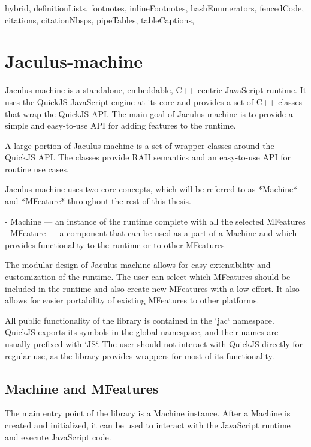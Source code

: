 \begin{markdown*}{%
  hybrid,
  definitionLists,
  footnotes,
  inlineFootnotes,
  hashEnumerators,
  fencedCode,
  citations,
  citationNbsps,
  pipeTables,
  tableCaptions,
}

\chapter{Jaculus-machine} \label{chap:machine}

Jaculus-machine is a standalone, embeddable, C++ centric JavaScript runtime. It uses the QuickJS JavaScript engine at its core and provides a set of C++ classes that wrap the QuickJS API. The main goal of Jaculus-machine is to provide a simple and easy-to-use API for adding features to the runtime.

A large portion of Jaculus-machine is a set of wrapper classes around the QuickJS API. The classes provide RAII semantics and an easy-to-use API for routine use cases.

Jaculus-machine uses two core concepts, which will be referred to as *Machine* and *MFeature* throughout the rest of this thesis.

  - Machine --- an instance of the runtime complete with all the selected MFeatures
  - MFeature --- a component that can be used as a part of a Machine and which provides functionality to the runtime or to other MFeatures

The modular design of Jaculus-machine allows for easy extensibility and customization of the runtime. The user can select which MFeatures should be included in the runtime and also create new MFeatures with a low effort. It also allows for easier portability of existing MFeatures to other platforms.

All public functionality of the library is contained in the `jac` namespace. QuickJS exports its symbols in the global namespace, and their names are usually prefixed with `JS`. The user should not interact with QuickJS directly for regular use, as the library provides wrappers for most of its functionality.

\section{Machine and MFeatures}

The main entry point of the library is a Machine instance. After a Machine is created and initialized, it can be used to interact with the JavaScript runtime and execute JavaScript code.


\end{markdown*}
